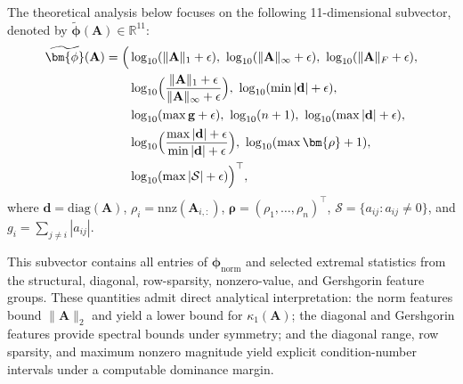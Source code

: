 \documentclass[11pt,a4paper]{article}
\theoremstyle{plain}
\theoremstyle{definition}
\theoremstyle{remark}
\begin{document}
The theoretical analysis below focuses on the following 11-dimensional subvector,
denoted by $\widetilde{\bm{\phi}}(\mathbf A)\in\mathbb R^{11}$:
\begin{equation}\label{eq:feature1}
\begin{aligned}
\widetilde{\bm{\phi}}(\mathbf A)=\Bigl(
&\log_{10}(\|\mathbf A\|_1+\epsilon),\ 
\log_{10}(\|\mathbf A\|_\infty+\epsilon),\ 
\log_{10}(\|\mathbf A\|_F+\epsilon), \\
&\log_{10}\Bigl(\frac{\|\mathbf A\|_1+\epsilon}
{\|\mathbf A\|_\infty+\epsilon}\Bigr),\ 
\log_{10}(\min |\mathbf d|+\epsilon), \\
&\log_{10}(\max \mathbf g+\epsilon),\ 
\log_{10}(n+1),\ 
\log_{10}(\max |\mathbf d|+\epsilon), \\
&\log_{10}\Bigl(\frac{\max |\mathbf d|+\epsilon}
{\min |\mathbf d|+\epsilon}\Bigr),\ 
\log_{10}(\max \bm{\rho}+1), \\
&\log_{10}(\max |\mathcal S|+\epsilon)
\Bigr)^\top,
\end{aligned}
\end{equation}
where $\mathbf d=\mathrm{diag}(\mathbf A)$, 
$\rho_i=\mathrm{nnz}(\mathbf A_{i,:})$, 
$\bm{\rho}=(\rho_1,\ldots,\rho_n)^\top$, 
$\mathcal S=\{a_{ij}:a_{ij}\neq 0\}$, and 
$g_i=\sum_{j\neq i}|a_{ij}|$.


This subvector contains all entries of $\bm{\phi}_{\mathrm{norm}}$ and selected extremal statistics from the structural, diagonal, row-sparsity, nonzero-value, and Gershgorin feature groups. These quantities admit direct analytical interpretation: the norm features bound $\|\mathbf A\|_2$ and yield a lower bound for $\kappa_1(\mathbf A)$; the diagonal and Gershgorin features provide spectral bounds under symmetry; and the diagonal range, row sparsity, and maximum nonzero magnitude yield explicit condition-number intervals under a computable dominance margin.
\end{document}
